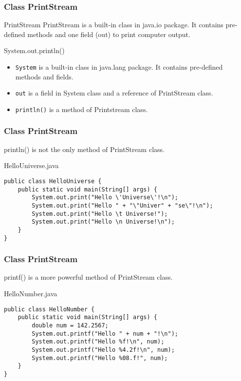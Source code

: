\documentclass[10pt, compress]{beamer}
\begin{document}
\begin{frame}[fragile]
	\frametitle{Class PrintStream}
	\begin{block}{PrintStream}
		PrintStream is a built-in class in java.io package. It contains pre-defined methods and one field (out) to print computer output.
	\end{block}
	\begin{block}{System.out.println()}
		\begin{itemize}
			\item[] \texttt{System} is a built-in class in java.lang package. It contains pre-defined methods and fields.
			\item[] \texttt{out} is a field in System class and a reference of PrintStream class.
			\item[] \texttt{println()} is a method of Printstream class.
		\end{itemize}
	\end{block}
\end{frame}

\begin{frame}[fragile]
	\frametitle{Class PrintStream}
	println() is not the only method of PrintStream class.
	\begin{block}{HelloUniverse.java}
	\begin{verbatim}
public class HelloUniverse {
    public static void main(String[] args) {
        System.out.print("Hello \'Universe\'!\n");
        System.out.print("Hello " + "\"Univer" + "se\"!\n");
        System.out.print("Hello \t Universe!");
        System.out.print("Hello \n Universe!\n");
    }
}
	\end{verbatim}
	\end{block}
\end{frame}

\begin{frame}[fragile]
	\frametitle{Class PrintStream}
	printf() is a more powerful method of PrintStream class.
	\begin{block}{HelloNumber.java}
	\begin{verbatim}
public class HelloNumber {
    public static void main(String[] args) {
        double num = 142.2567;
        System.out.printf("Hello " + num + "!\n");
        System.out.printf("Hello %f!\n", num);
        System.out.printf("Hello %4.2f!\n", num);
        System.out.printf("Hello %08.f!", num);
    }
}
	\end{verbatim}
	\end{block}
\end{frame}
\end{document}
